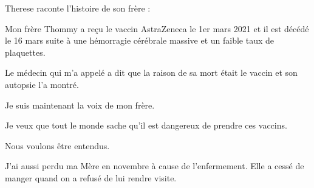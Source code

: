 Therese raconte l'histoire de son frère :

Mon frère Thommy a reçu le vaccin AstraZeneca le 1er mars 2021 et il est décédé
le 16 mars suite à une hémorragie cérébrale massive et un faible taux de
plaquettes.

Le médecin qui m'a appelé a dit que la raison de sa mort était le vaccin et son
autopsie l'a montré.

Je suis maintenant la voix de mon frère.

Je veux que tout le monde sache qu'il est dangereux de prendre ces vaccins.

Nous voulons être entendus.

J'ai aussi perdu ma Mère en novembre à cause de l'enfermement. Elle a cessé de
manger quand on a refusé de lui rendre visite.

